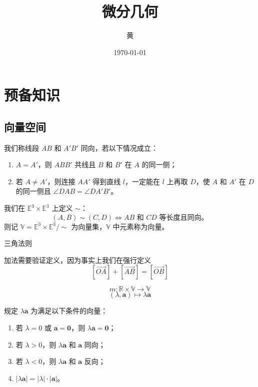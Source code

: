 \documentclass[lang=cn,10pt,thmcnt=section]{elegantbook}
\title{微分几何}
\author{黄}
\date{\today}
\renewcommand{\vec}[1]{\mathbf{#1}}
\begin{document}
	
	\maketitle
	\frontmatter
	
	\tableofcontents
	
	\mainmatter
\chapter{预备知识}
\section{向量空间}
\begin{definition}[同向]
    我们称线段 $AB$ 和 $A'B'$ 同向，若以下情况成立：
    \begin{enumerate}
        \item $A = A'$，则 $ABB'$ 共线且 $B$ 和 $B'$ 在 $A$ 的同一侧；
        \item 若 $A \neq A'$，则连接 $AA'$ 得到直线 $l$，一定能在 $l$ 上再取 $D$，使 $A$ 和 $A'$ 在 $D$ 的同一侧且 $\angle DAB = \angle DA'B'$。
    \end{enumerate}
\end{definition}

\begin{definition}[向量集]
    我们在 $\mathbb{E}^3 \times \mathbb{E}^3$ 上定义 $\sim$：
    \[
    (A, B) \sim (C, D) \iff AB \text{ 和 } CD \text{ 等长度且同向。}
    \]
    则记 $\mathbb{V} = \mathbb{E}^3 \times \mathbb{E}^3 / \sim$ 为向量集，$\mathbb{V}$ 中元素称为向量。
\end{definition}
\begin{definition}[加法]
 三角法则
\end{definition}

\begin{remark}
    加法需要验证定义，因为事实上我们在强行定义
\[
[\overrightarrow{OA}] + [\overrightarrow{AB}] = [\overrightarrow{OB}]
\]
\end{remark}
\begin{definition}[数乘]
    \[
m : \mathbb{R} \times \mathbb{V} \rightarrow \mathbb{V}
\]
\[
(\lambda, \vec{a}) \mapsto \lambda \vec{a}
\]
\end{definition}

\begin{definition}
    规定 $\lambda \vec{a}$ 为满足以下条件的向量：
    \begin{enumerate}
        \item 若 $\lambda = 0$ 或 $\vec{a} = \vec{0}$，则 $\lambda \vec{a} = \vec{0}$；
        \item 若 $\lambda > 0$，则 $\lambda \vec{a}$ 和 $\vec{a}$ 同向；
        \item 若 $\lambda < 0$，则 $\lambda \vec{a}$ 和 $\vec{a}$ 反向；
        \item $|\lambda \vec{a}| = |\lambda| \cdot |\vec{a}|$。
    \end{enumerate}
\end{definition}
\end{document}
